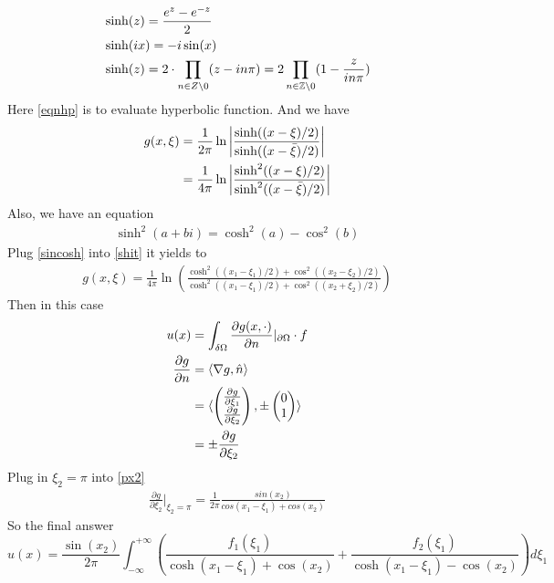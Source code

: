 \documentclass{article}
\numberwithin{equation}{section}
\newcommand{\<}{\langle}
\begin{document}
\begin{align}
	&\sinh(z) = \frac{e^z - e^{-z}}{2} \notag \\
	&\sinh(ix) = -i \sin(x) \notag \\
	&\sinh(z) = 2\cdot \prod_{n \in Z \backslash 0} (z - i n \pi) = 2 \prod_{ n \in \mathbb{Z}\backslash 0}(1- \frac{z}{i n \pi}) \label{eqnhp}
\end{align}
Here \ref{eqnhp} is to evaluate hyperbolic function. 
And we have
\begin{align}
	g(x, \xi) &= \frac{1}{2 \pi} \ln \left| \frac{\sinh((x- \xi)/2	)}{\sinh((x- \bar\xi)/2)} \right| \notag\\
	&= \frac{1}{4 \pi} \ln\left|\frac{\sinh^2((x- \xi)/2)}{\sinh^2((x- \bar\xi)/2)}\right| \label{shit}
\end{align}
Also, we have an equation
\begin{align}
	\sinh^2 (a+bi) = \cosh^2(a) - \cos^2(b) \label{sincosh}
\end{align}
Plug \eqref{sincosh} into \eqref{shit}
it yields to 
\begin{align}
	g(x,\xi) = \frac{1}{4 \pi} \ln \left( \frac{\cosh^2((x_1 - \xi_1)/2) + \cos^2 ((x_2 - \xi_2)/2)}{\cosh^2((x_1 - \xi_1)/2) + \cos^2 ((x_2 + \xi_2)/2)} \right)
\end{align}
Then in this case
\begin{align}
	u(x) &= \int_{\delta \Omega} \frac{\partial g(x,\cdot )}{\partial n}|_{\partial \Omega} \cdot f \label{px2}\\
	\frac{\partial g}{\partial n} &= \langle \nabla g, \hat n\rangle \notag \\
	&= \langle \begin{pmatrix} \frac{\partial g}{\partial \xi_1} \\ \frac{\partial g}{\partial \xi_2} \end{pmatrix} , \pm \begin{pmatrix}0 \\ 1\end{pmatrix}  \rangle \notag \\
	&= \pm \frac{\partial g}{\partial \xi_2} 
\end{align}
Plug in $\xi_2 = \pi$ into \eqref{px2}
\begin{align}
	\frac{\partial g}{\partial \xi_2} |_{\xi_2 = \pi} = \frac{1}{2 \pi} \frac{sin(x_2)}{cos(x_1 - \xi_1)+ cos(x_2)}
\end{align}
So the final answer
\[
	u(x) = \frac{\sin(x_2)}{2 \pi} \int_{-\infty} ^{+\infty} \left(\frac{f_1(\xi_1)}{\cosh(x_1 - \xi_1)+ \cos(x_2)}+\frac{f_2(\xi_1)}{\cosh(x_1 - \xi_1)- \cos(x_2)}\right) d \xi_1
\]
\end{document}
